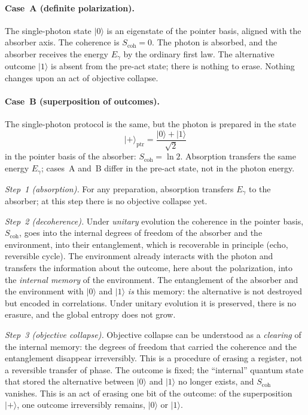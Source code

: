 \documentclass[11pt,a4paper]{article}
\begin{document}
\paragraph{Case~A (definite polarization).}
The single-photon state $|0\rangle$ is an eigenstate of the pointer basis, aligned with the absorber axis. The coherence is $S_{\mathrm{coh}}=0$. The photon is absorbed, and the absorber receives the energy $E_\gamma$ by the ordinary first law. The alternative outcome $|1\rangle$ is absent from the pre-act state; there is nothing to erase. Nothing changes upon an act of objective collapse.

\paragraph{Case~B (superposition of outcomes).}
The single-photon protocol is the same, but the photon is prepared in the state
\begin{equation}
|{+}\rangle_{\mathrm{ptr}} = \frac{|0\rangle + |1\rangle}{\sqrt{2}}
\end{equation}
in the pointer basis of the absorber: $S_{\mathrm{coh}}=\ln 2$. Absorption transfers the same energy $E_\gamma$; cases~A and~B differ in the pre-act state, not in the photon energy.

\emph{Step~1 (absorption).} For any preparation, absorption transfers $E_\gamma$ to the absorber; at this step there is no objective collapse yet.

\emph{Step~2 (decoherence).} Under \emph{unitary} evolution the coherence in the pointer basis, $S_{\mathrm{coh}}$, goes into the internal degrees of freedom of the absorber and the environment, into their entanglement, which is recoverable in principle (echo, reversible cycle). The environment already interacts with the photon and transfers the information about the outcome, here about the polarization, into the \emph{internal memory} of the environment. The entanglement of the absorber and the environment with $|0\rangle$ and $|1\rangle$ \emph{is} this memory: the alternative is not destroyed but encoded in correlations. Under unitary evolution it is preserved, there is no erasure, and the global entropy does not grow.

\emph{Step~3 (objective collapse).} Objective collapse can be understood as a \emph{clearing} of the internal memory: the degrees of freedom that carried the coherence and the entanglement disappear irreversibly. This is a procedure of erasing a register, not a reversible transfer of phase. The outcome is fixed; the ``internal'' quantum state that stored the alternative between $|0\rangle$ and $|1\rangle$ no longer exists, and $S_{\mathrm{coh}}$ vanishes. This is an act of erasing one bit of the outcome: of the superposition $|{+}\rangle$, one outcome irreversibly remains, $|0\rangle$ or $|1\rangle$.
\end{document}
